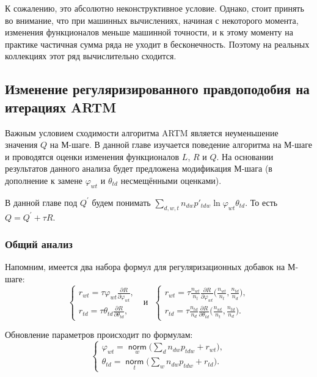 \documentclass[12pt]{article}
\renewcommand{\phi}{\varphi}
\newcommand{\norm}{\mathop{\mathsf{norm}}\limits}
\begin{document}
К сожалению, это абсолютно неконструктивное условие. Однако, стоит принять во внимание, что при машинных вычислениях, начиная с некоторого момента, изменения функционалов меньше машинной точности, и к этому моменту на практике частичная сумма ряда не уходит в бесконечность. Поэтому  на реальных коллекциях этот ряд вычислительно сходится.
	\subsection{Изменение регуляризированного правдоподобия на итерациях ARTM}
Важным условием сходимости алгоритма ARTM является неуменьшение значения $Q$ на М-шаге. В данной главе изучается поведение алгоритма на М-шаге и проводятся оценки изменения функционалов $L$, $R$ и $Q$. На основании результатов данного анализа будет предложена  модификация М-шага (в дополнение к замене $\phi_{wt}$ и $\theta_{td}$ несмещёнными оценками).

В данной главе под $Q^{\prime}$ будем понимать $\sum\limits_{d, w, t} n_{dw} p'_{tdw} \ln{\phi_{wt}\theta_{td}}$. То есть $Q = Q^{\prime} + \tau R$.

	\subsubsection{Общий анализ}
Напомним, имеется  два набора формул для регуляризационных добавок на М-шаге:
\[
\left\{
	\begin{aligned}
		r_{wt}= \tau\phi_{wt} \frac{\partial{R}}{\partial{\phi_{wt}}},\\
		r_{td} = \tau\theta_{td} \frac{\partial{R}}{\partial{\theta_{td}}},
	\end{aligned}
\right.
\text{~~и~~}
\left\{
	\begin{aligned}
		r_{wt} = \tau \frac{n_{wt}}{n_t} \frac{\partial{R}}{\partial{\phi_{wt}}} \biggl(\frac{n_{wt}}{n_t}, \frac{n_{td}}{n_d}\biggr),\\
		r_{td}= \tau \frac{n_{td}}{n_d} \frac{\partial{R}}{\partial{\theta_{td}}} \biggl(\frac{n_{wt}}{n_t}, \frac{n_{td}}{n_d}\biggr).
	\end{aligned}
\right.
\]

Обновление параметров происходит по формулам:
\[
\left\{
\begin{aligned}
 \phi_{wt}  = \norm_w \bigl(\sum_d n_{dw} p_{tdw} + r_{wt} \bigr),\\
\theta_{td} = \norm_t  \bigl(\sum_w n_{dw} p_{tdw} + r_{td}\bigr).
\end{aligned}
\right.
\]
\end{document}
